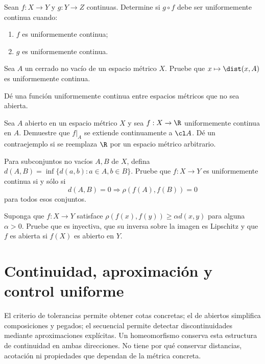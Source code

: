 \begin{ejercicio}\label{ej:lectura-7-2}
Sean $f:X\to Y$ y $g:Y\to Z$ continuas. Determine si $g\circ f$ debe ser uniformemente continua cuando: \begin{enumerate}[label=(\roman*)]
\item $f$ es uniformemente continua;
\item $g$ es uniformemente continua.
\end{enumerate}
\end{ejercicio}


\begin{ejercicio}\label{ej:lectura-7-3}
Sea $A$ un cerrado no vacío de un espacio métrico $X$. Pruebe que $x\mapsto\dist(x,A)$ es uniformemente continua.
\end{ejercicio}


\begin{ejercicio}\label{ej:lectura-7-4}
Dé una función uniformemente continua entre espacios métricos que no sea abierta.
\end{ejercicio}


\begin{ejercicio}\label{ej:lectura-7-5}\label{ch07:ej-extension}
Sea $A$ abierto en un espacio métrico $X$ y sea $f:X\to\R$ uniformemente continua en $A$. Demuestre que $f|_A$ se extiende continuamente a $\cl A$. Dé un contraejemplo si se reemplaza $\R$ por un espacio métrico arbitrario.
\end{ejercicio}


\begin{ejercicio}\label{ej:lectura-7-6}
Para subconjuntos no vacíos $A,B$ de $X$, defina $d(A,B)=\inf\{d(a,b):a\in A,b\in B\}$. Pruebe que $f:X\to Y$ es uniformemente continua si y sólo si
\[
 d(A,B)=0\Longrightarrow\rho(f(A),f(B))=0
\]
para todos esos conjuntos.
\end{ejercicio}


\begin{ejercicio}\label{ej:lectura-7-7}
Suponga que $f:X\to Y$ satisface $\rho(f(x),f(y))\geq\alpha d(x,y)$ para alguna $\alpha>0$. Pruebe que es inyectiva, que su inversa sobre la imagen es Lipschitz y que $f$ es abierta si $f(X)$ es abierto en $Y$.
\end{ejercicio}


\section{Continuidad, aproximación y control uniforme}
El criterio de tolerancias permite obtener cotas concretas; el de abiertos simplifica composiciones y pegados; el secuencial permite detectar discontinuidades mediante aproximaciones explícitas. Un homeomorfismo conserva esta estructura de continuidad en ambas direcciones. No tiene por qué conservar distancias, acotación ni propiedades que dependan de la métrica concreta.


